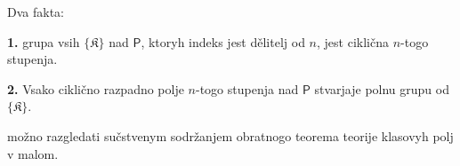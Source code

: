 \documentclass[11pt]{article}
\begin{document}
Dva fakta:

\noindent\textbf{1.} grupa vsih \(\{\mathfrak K\}\) nad \(\mathsf{P}\), ktoryh indeks jest dělitelj od \(n\), jest ciklična \(n\)-togo stupenja.

\noindent\textbf{2.} Vsako ciklično razpadno polje \(n\)-togo stupenja nad \(\mathsf{P}\) stvarjaje polnu grupu od \(\{\mathfrak K\}\).

možno razgledati sučstvenym sodržanjem obratnogo teorema teorije klasovyh polj v malom.


\clearpage
\end{document}
